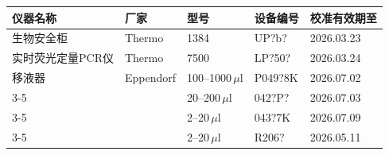 \documentclass[UTF8,10pt,a4paper,fontset=fandol]{ctexart}
\newcommand{\fieldvalue}[1]{#1}
\newcommand{\handwritten}[1]{#1}
\begin{document}
\begin{tabular}{|p{3.0cm}|p{2.0cm}|p{3.3cm}|p{3.1cm}|p{3.0cm}|}
\hline
仪器名称 & 厂家 & 型号 & 设备编号 & 校准有效期至 \\
\hline
生物安全柜 & Thermo & 1384 &
\fieldvalue{\handwritten{UP?b?}} &
\fieldvalue{\handwritten{2026.03.23}}
\\
\hline
实时荧光定量PCR仪 & Thermo & 7500 &
\fieldvalue{\handwritten{LP?50?}} &
\fieldvalue{\handwritten{2026.03.24}}
\\
\hline
移液器 & Eppendorf &
\fieldvalue{\handwritten{100--1000\,$\mu$l}} &
\fieldvalue{\handwritten{P049?8K}} &
\fieldvalue{\handwritten{2026.07.02}}
\\
\cline{3-5}
& &
\fieldvalue{\handwritten{20--200\,$\mu$l}} &
\fieldvalue{\handwritten{042?P?}} &
\fieldvalue{\handwritten{2026.07.03}}
\\
\cline{3-5}
& &
\fieldvalue{\handwritten{2--20\,$\mu$l}} &
\fieldvalue{\handwritten{043?7K}} &
\fieldvalue{\handwritten{2026.07.09}}
\\
\cline{3-5}
& &
\fieldvalue{\handwritten{2--20\,$\mu$l}} &
\fieldvalue{\handwritten{R206?}} &
\fieldvalue{\handwritten{2026.05.11}}
\\
\hline
\end{tabular}
\end{document}
